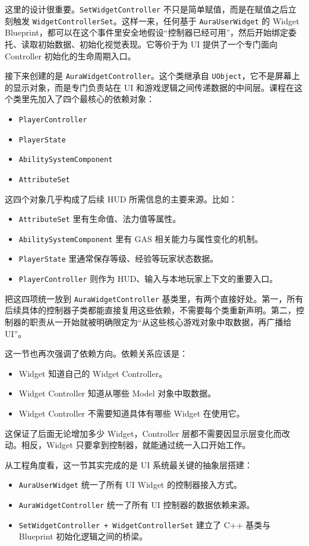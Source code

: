 这里的设计很重要。\texttt{SetWidgetController} 不只是简单赋值，而是在赋值之后立刻触发 \texttt{WidgetControllerSet}。这样一来，任何基于 \texttt{AuraUserWidget} 的 Widget Blueprint，都可以在这个事件里安全地假设“控制器已经可用”，然后开始绑定委托、读取初始数据、初始化视觉表现。它等价于为 UI 提供了一个专门面向 Controller 初始化的生命周期入口。

接下来创建的是 \texttt{AuraWidgetController}。这个类继承自 \texttt{UObject}，它不是屏幕上的显示对象，而是专门负责站在 UI 和游戏逻辑之间传递数据的中间层。课程在这个类里先加入了四个最核心的依赖对象：
\begin{itemize}
	\item \texttt{PlayerController}
	\item \texttt{PlayerState}
	\item \texttt{AbilitySystemComponent}
	\item \texttt{AttributeSet}
\end{itemize}

这四个对象几乎构成了后续 HUD 所需信息的主要来源。比如：
\begin{itemize}
	\item \texttt{AttributeSet} 里有生命值、法力值等属性。
	\item \texttt{AbilitySystemComponent} 里有 GAS 相关能力与属性变化的机制。
	\item \texttt{PlayerState} 里通常保存等级、经验等玩家状态数据。
	\item \texttt{PlayerController} 则作为 HUD、输入与本地玩家上下文的重要入口。
\end{itemize}

把这四项统一放到 \texttt{AuraWidgetController} 基类里，有两个直接好处。第一，所有后续具体的控制器子类都能直接复用这些依赖，不需要每个类重新声明。第二，控制器的职责从一开始就被明确限定为“从这些核心游戏对象中取数据，再广播给 UI”。

这一节也再次强调了依赖方向。依赖关系应该是：
\begin{itemize}
	\item Widget 知道自己的 Widget Controller。
	\item Widget Controller 知道从哪些 Model 对象中取数据。
	\item Widget Controller 不需要知道具体有哪些 Widget 在使用它。
\end{itemize}

这保证了后面无论增加多少 Widget，Controller 层都不需要因显示层变化而改动。相反，Widget 只要拿到控制器，就能通过统一入口开始工作。

从工程角度看，这一节其实完成的是 UI 系统最关键的抽象层搭建：
\begin{itemize}
	\item \texttt{AuraUserWidget} 统一了所有 UI Widget 的控制器接入方式。
	\item \texttt{AuraWidgetController} 统一了所有 UI 控制器的数据依赖来源。
	\item \texttt{SetWidgetController + WidgetControllerSet} 建立了 C++ 基类与 Blueprint 初始化逻辑之间的桥梁。
\end{itemize}

